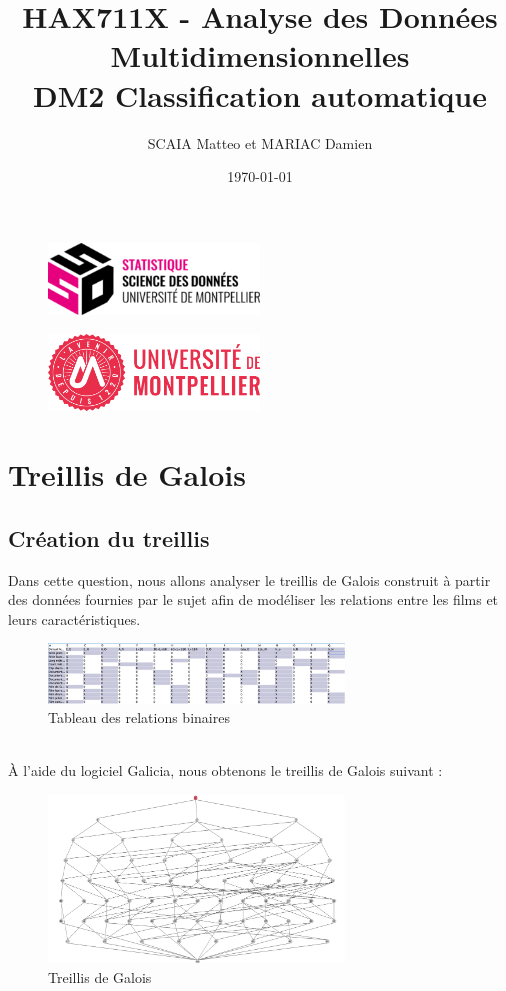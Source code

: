 \documentclass{article}
\title{HAX711X - Analyse des Données Multidimensionnelles \\ DM2 Classification automatique}
\author{SCAIA Matteo et MARIAC Damien}
\date{\today}
\begin{document}
\maketitle

\begin{figure}[h] 
    \centering
    \includegraphics[width=0.5\textwidth]{ssd_logo.png} 
\end{figure}

\begin{figure}[h] 
    \centering
    \includegraphics[width=0.5\textwidth]{logo_um_2022_rouge_RVB.png} 
\end{figure}

\newpage

\tableofcontents

\newpage
\section{Treillis de Galois}
\subsection{Création du treillis}
Dans cette question, nous allons analyser le treillis de Galois construit à partir des données fournies par le sujet afin de modéliser les relations entre les films et leurs caractéristiques.
\begin{figure}[h]
    \centering
    \includegraphics[width=0.7\textwidth]{tableau.png}
    \caption{Tableau des relations binaires}
    \label{fig:tableau} 
\end{figure}
\\
À l'aide du logiciel Galicia, nous obtenons le treillis de Galois suivant :
\begin{figure}[h]
    \centering
    \includegraphics[width=0.7\textwidth]{treillis.png}
    \caption{Treillis de Galois}
    \label{fig:treillis} 
\end{figure}
\\
\end{document}
